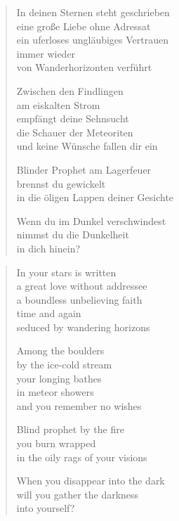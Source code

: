
\cleartoverso


\begin{verse}

In deinen Sternen steht geschrieben\\
eine große Liebe ohne Adressat\\
ein uferloses ungläubiges Vertrauen\\
immer wieder\\
von Wanderhorizonten verführt

Zwischen den Findlingen\\
am eiskalten Strom\\
empfängt deine Sehnsucht\\
die Schauer der Meteoriten\\
und keine Wünsche fallen dir ein

Blinder Prophet am Lagerfeuer\\
brennst du gewickelt\\
in die öligen Lappen deiner Gesichte

Wenn du im Dunkel verschwindest\\
nimmst du die Dunkelheit\\
in dich hinein?

\end{verse}

\clearpage


\begin{verse}

In your stars is written\\
a great love without addressee\\
a boundless unbelieving faith\\
time and again\\
seduced by wandering horizons

Among the boulders\\
by the ice-cold stream\\
your longing bathes\\
in meteor showers\\
and you remember no wishes

Blind prophet by the fire\\
you burn wrapped\\
in the oily rags of your visions

When you disappear into the dark\\
will you gather the darkness\\
into yourself?

\end{verse}

